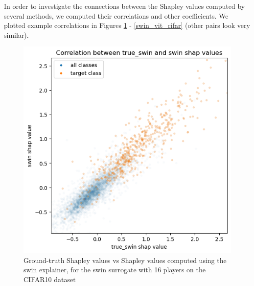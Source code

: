 \documentclass[magisterska,en]{pracamgr}
\begin{document}
In order to investigate the connections between the Shapley values computed by several methods, we computed their correlations and other coefficients. We plotted example correlations in Figures \ref{true_swin_swin_cifar} - \ref{swin_vit_cifar} (other pairs look very similar).



\begin{figure}[H]
\centering
\includegraphics[scale=0.5]{./images/true_swin_swin_cifar.png}
\caption{Ground-truth Shapley values vs Shapley values computed using the swin explainer, for the swin surrogate with 16 players on the CIFAR10 dataset}
\label{true_swin_swin_cifar}
\end{figure}
\end{document}
